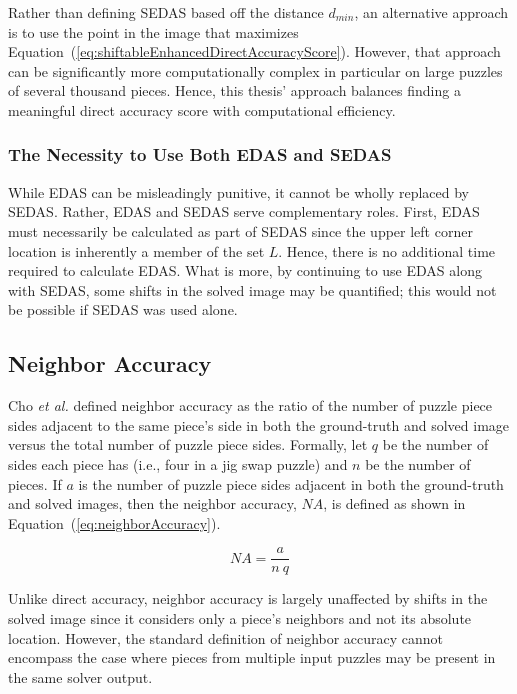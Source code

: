 \documentclass{report}
\def\eref#1{(\ref{#1})}
\begin{document}
Rather than defining SEDAS based off the distance $d_{min}$, an alternative approach is to use the point in the image that maximizes Equation~\eref{eq:shiftableEnhancedDirectAccuracyScore}.  However, that approach can be significantly more computationally complex in particular on large puzzles of several thousand pieces.  Hence, this thesis' approach balances finding a meaningful direct accuracy score with computational efficiency.

\subsubsection{The Necessity to Use Both EDAS and SEDAS}\label{sec:importanceEdasSedas}

While EDAS can be misleadingly punitive, it cannot be wholly replaced by SEDAS.  Rather, EDAS and SEDAS serve complementary roles.  First, EDAS must necessarily be calculated as part of SEDAS since the upper left corner location is inherently a member of the set $L$.  Hence, there is no additional time required to calculate EDAS.  What is more, by continuing to use EDAS along with SEDAS, some shifts in the solved image may be quantified; this would not be possible if SEDAS was used alone.

\subsection{Neighbor Accuracy}\label{sec:neighborAccuracy}

Cho \textit{et al.} \cite{cho2010} defined neighbor accuracy as the ratio of the number of puzzle piece sides adjacent to the same piece's side in both the ground-truth and solved image versus the total number of puzzle piece sides.  Formally, let $q$ be the number of sides each piece has (i.e., four in a jig swap puzzle) and $n$ be the number of pieces.  If $a$ is the number of puzzle piece sides adjacent in both the ground-truth and solved images, then the neighbor accuracy, $NA$, is defined as shown in Equation~\eref{eq:neighborAccuracy}.

\begin{equation} \label{eq:neighborAccuracy}
NA = \frac{a}{n~q}
\end{equation}

Unlike direct accuracy, neighbor accuracy is largely unaffected by shifts in the solved image since it considers only a piece's neighbors and not its absolute location.  However, the standard definition of neighbor accuracy cannot encompass the case where pieces from multiple input puzzles may be present in the same solver output.  
\end{document}
